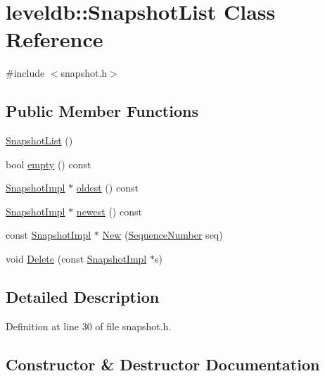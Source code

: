 \hypertarget{classleveldb_1_1_snapshot_list}{}\section{leveldb\+:\+:Snapshot\+List Class Reference}
\label{classleveldb_1_1_snapshot_list}


{\ttfamily \#include $<$snapshot.\+h$>$}

\subsection*{Public Member Functions}
\begin{DoxyCompactItemize}
\item 
\hyperlink{classleveldb_1_1_snapshot_list_a8e312959c2c2e2e64e9bb7eaca2459ae}{Snapshot\+List} ()
\item 
bool \hyperlink{classleveldb_1_1_snapshot_list_a27da501f33ea4aff4bb13c3443f98f70}{empty} () const 
\item 
\hyperlink{classleveldb_1_1_snapshot_impl}{Snapshot\+Impl} $\ast$ \hyperlink{classleveldb_1_1_snapshot_list_ad5990de13c4afa6877f8f3c641d8e72d}{oldest} () const 
\item 
\hyperlink{classleveldb_1_1_snapshot_impl}{Snapshot\+Impl} $\ast$ \hyperlink{classleveldb_1_1_snapshot_list_a783918fabc82113d6ffb014ce67395dc}{newest} () const 
\item 
const \hyperlink{classleveldb_1_1_snapshot_impl}{Snapshot\+Impl} $\ast$ \hyperlink{classleveldb_1_1_snapshot_list_adfd5d9c7cb888e711d83a48299141994}{New} (\hyperlink{namespaceleveldb_a5481ededd221c36d652c371249f869fa}{Sequence\+Number} seq)
\item 
void \hyperlink{classleveldb_1_1_snapshot_list_aa16863f35b8bb6dbc44f4528fab6790a}{Delete} (const \hyperlink{classleveldb_1_1_snapshot_impl}{Snapshot\+Impl} $\ast$s)
\end{DoxyCompactItemize}


\subsection{Detailed Description}


Definition at line 30 of file snapshot.\+h.



\subsection{Constructor \& Destructor Documentation}
\hypertarget{classleveldb_1_1_snapshot_list_a8e312959c2c2e2e64e9bb7eaca2459ae}{}

